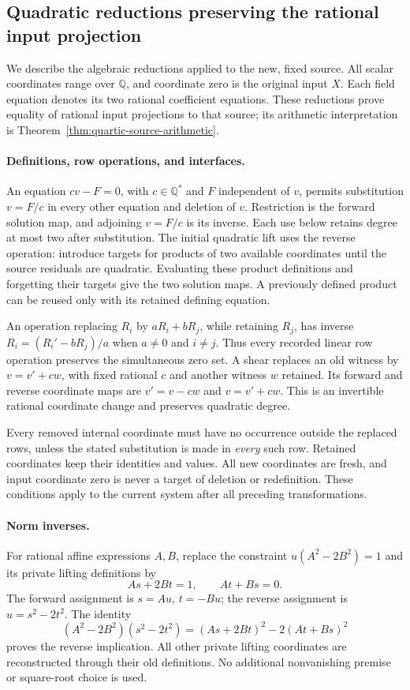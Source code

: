\documentclass[11pt]{article}
\theoremstyle{definition}
\theoremstyle{remark}
\newcommand{\Q}{\mathbb Q}
\begin{document}
\subsection{Quadratic reductions preserving the rational input projection}
\label{subsec:quartic-reductions}

We describe the algebraic reductions applied to the new, fixed source.
All scalar coordinates range over $\Q$, and coordinate zero is the original
input $X$. Each field equation denotes its two rational coefficient
equations. These reductions prove equality of rational input projections
to that source; its arithmetic interpretation is
Theorem~\ref{thm:quartic-source-arithmetic}.

\paragraph{Definitions, row operations, and interfaces.}
An equation $cv-F=0$, with $c\in\Q^*$ and $F$ independent of $v$,
permits substitution $v=F/c$ in every other equation and deletion of $v$.
Restriction is the forward solution map, and adjoining $v=F/c$ is its
inverse. Each use below retains degree at most two after substitution.
The initial quadratic lift uses the reverse operation: introduce targets
for products of two available coordinates until the source residuals are
quadratic. Evaluating these product definitions and forgetting their
targets give the two solution maps. A previously defined product can be
reused only with its retained defining equation.

An operation replacing $R_i$ by $aR_i+bR_j$, while retaining $R_j$,
has inverse $R_i=(R_i'-bR_j)/a$ when $a\ne0$ and $i\ne j$.
Thus every recorded linear row operation preserves the simultaneous zero
set. A shear replaces an old witness by $v=v'+cw$, with fixed rational
$c$ and another witness $w$ retained. Its forward and reverse coordinate
maps are $v'=v-cw$ and $v=v'+cw$. This is an invertible rational coordinate
change and preserves quadratic degree.

Every removed internal coordinate must have no occurrence outside the
replaced rows, unless the stated substitution is made in \emph{every}
such row. Retained coordinates keep their identities and values. All new
coordinates are fresh, and input coordinate zero is never a target of
deletion or redefinition. These conditions apply to the current system
after all preceding transformations.

\paragraph{Norm inverses.}
For rational affine expressions $A,B$, replace the constraint
$u(A^2-2B^2)=1$ and its private lifting definitions by
\[
 As+2Bt=1,\qquad At+Bs=0.
\]
The forward assignment is $s=Au$, $t=-Bu$; the reverse assignment is
$u=s^2-2t^2$. The identity
\[
 (A^2-2B^2)(s^2-2t^2)=(As+2Bt)^2-2(At+Bs)^2
\]
proves the reverse implication. All other private lifting coordinates
are reconstructed through their old definitions. No additional
nonvanishing premise or square-root choice is used.
\end{document}
